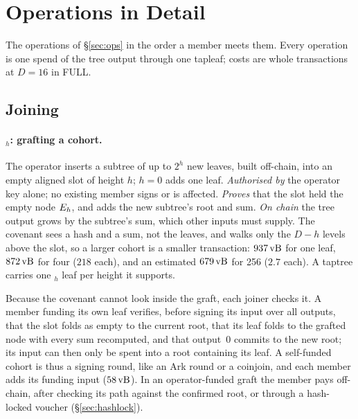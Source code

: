 \section{Operations in Detail}\label{app:ops}

The operations of \S\ref{sec:ops} in the order a member meets them. Every
operation is one spend of the tree output through one tapleaf; costs are
whole transactions at $D = 16$ in FULL.

\subsection{Joining}

\paragraph{$_h$: grafting a cohort.} The operator inserts a
subtree of up to $2^h$ new leaves, built off-chain, into an empty aligned
slot of height $h$; $h = 0$ adds one leaf. \emph{Authorised by} the
operator key alone; no existing member signs or is affected.
\emph{Proves} that the slot held the empty node $E_h$, and adds the new
subtree's root and sum. \emph{On chain} the tree output grows by the
subtree's sum, which other inputs must supply. The covenant sees a hash
and a sum, not the leaves, and walks only the $D - h$ levels above the
slot, so a larger cohort is a smaller transaction: $937\,\mathrm{vB}$ for one
leaf, $872\,\mathrm{vB}$ for four ($218$ each), and an estimated $679\,\mathrm{vB}$ for 256
($2.7$ each). A taptree carries one $_h$
leaf per height it supports.

Because the covenant cannot look inside the graft, each joiner checks
it. A member funding its own leaf verifies, before signing its input over
all outputs, that the slot folds as empty to the current root, that its
leaf folds to the grafted node with every sum recomputed, and that
output~0 commits to the new root; its input can then only be spent into
a root containing its leaf. A self-funded cohort is thus a signing
round, like an Ark round or a coinjoin, and each member adds its funding
input ($58\,\mathrm{vB}$). In an operator-funded graft the member pays off-chain,
after checking its path against the confirmed root, or through a
hash-locked voucher (\S\ref{sec:hashlock}).

